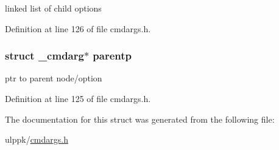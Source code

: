linked list of child options 



Definition at line 126 of file cmdargs.\-h.

\hypertarget{struct__cmdarg_aa8f98b01d07f3ae3514ed71bc0964e58}{
\subsubsection[{parentp}]{\setlength{\rightskip}{0pt plus 5cm}struct {\bf \-\_\-cmdarg}$\ast$ parentp}}\label{struct__cmdarg_aa8f98b01d07f3ae3514ed71bc0964e58}


ptr to parent node/option 



Definition at line 125 of file cmdargs.\-h.



The documentation for this struct was generated from the following file\-:\begin{DoxyCompactItemize}
\item 
ulppk/\hyperlink{cmdargs_8h}{cmdargs.\-h}\end{DoxyCompactItemize}
